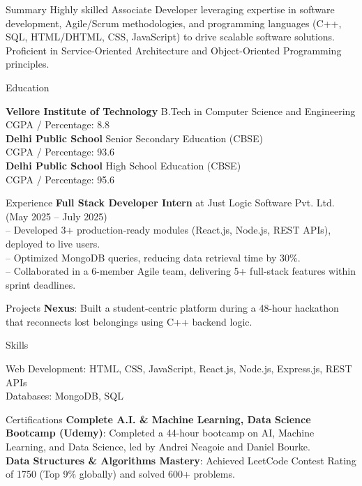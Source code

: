 \documentclass{resume}
\begin{document}
\begin{rSection}{Summary}
Highly skilled Associate Developer leveraging expertise in software development, Agile/Scrum methodologies, and programming languages (C++, SQL, HTML/DHTML, CSS, JavaScript) to drive scalable software solutions. Proficient in Service-Oriented Architecture and Object-Oriented Programming principles.
\end{rSection}

\begin{rSection}{Education}

\textbf{ Vellore Institute of Technology } \hfill B.Tech in Computer Science and Engineering\\
CGPA / Percentage: 8.8\\[6pt]

\textbf{ Delhi Public School } \hfill Senior Secondary Education (CBSE)\\
CGPA / Percentage: 93.6\\[6pt]

\textbf{ Delhi Public School } \hfill High School Education (CBSE)\\
CGPA / Percentage: 95.6\\[6pt]

\end{rSection}

\begin{rSection}{Experience}
\textbf{Full Stack Developer Intern} at Just Logic Software Pvt. Ltd. \hfill (May 2025 -- July 2025)\\
-- Developed 3+ production-ready modules (React.js, Node.js, REST APIs), deployed to live users.\\
-- Optimized MongoDB queries, reducing data retrieval time by 30\%.\\
-- Collaborated in a 6-member Agile team, delivering 5+ full-stack features within sprint deadlines.

\end{rSection}

\begin{rSection}{Projects}
\textbf{Nexus}: Built a student-centric platform during a 48-hour hackathon that reconnects lost belongings using C++ backend logic.
\end{rSection}

\begin{rSection}{Skills}

Web Development: HTML, CSS, JavaScript, React.js, Node.js, Express.js, REST APIs\\

Databases: MongoDB, SQL\\

\end{rSection}

\begin{rSection}{Certifications}
\textbf{Complete A.I. \& Machine Learning, Data Science Bootcamp (Udemy)}: Completed a 44-hour bootcamp on AI, Machine Learning, and Data Science, led by Andrei Neagoie and Daniel Bourke.\\
\textbf{Data Structures \& Algorithms Mastery}: Achieved LeetCode Contest Rating of 1750 (Top 9\% globally) and solved 600+ problems.\\
\end{rSection}
\end{document}
